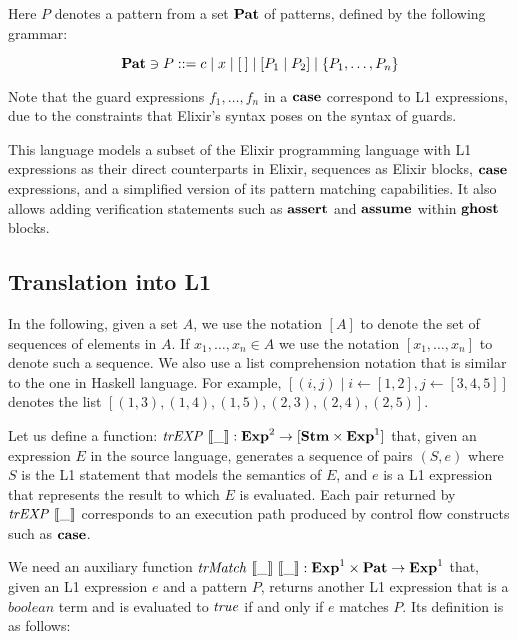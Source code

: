 Here $P$ denotes a pattern from a set $\mathbf{Pat}$ of patterns, defined by the 
following grammar:

\[
\mathbf{Pat} \ni P ::= c \mid x \mid [\:] \mid [P_1 \mid P_2] \mid \{ P_1, \ldots, P_n \}
\]

Note that the guard expressions $f_1, \ldots, f_n$ in a $\textbf{case}$ correspond to
L1 expressions, due to the constraints that Elixir's syntax poses on the syntax
of guards.

This language models a subset of the Elixir programming language with L1
expressions as their direct counterparts in Elixir, sequences as Elixir blocks,
$\textbf{case}$ expressions, and a simplified version of its pattern matching
capabilities.  It also allows adding verification statements such as $\textbf{assert}$
and $\textbf{assume}$ within $\textbf{ghost}$ blocks.

\subsection{Translation into L1}

In the following, given a set $A$, we use the notation $[A]$ to denote the set
of sequences of elements in $A$. If $x_1, \ldots, x_n \in A$ we use the notation
$[x_1, \ldots, x_n]$ to denote such a sequence. We also use a list comprehension
notation that is similar to the one in Haskell language. For example, $[(i, j)
\mid i \leftarrow [1, 2], j \leftarrow [3, 4, 5]]$ denotes the list $[(1, 3),
(1, 4), (1, 5), (2, 3), (2, 4), (2, 5)]$.

Let us define a function: $\mathit{trEXP}~\llbracket\_\rrbracket : \mathbf{Exp}^{2} \rightarrow [\mathbf{Stm} \times
\mathbf{Exp}^{1}]$ that, given an expression $E$ in the source language, generates a
sequence of pairs $(S, e)$ where $S$ is the L1 statement that models the
semantics of $E$, and $e$ is a L1 expression that represents the result to which
$E$ is evaluated. Each pair returned by $\mathit{trEXP}~\llbracket\_\rrbracket$ corresponds to an execution
path produced by control flow constructs such as $\textbf{case}$.

We need an auxiliary function $\mathit{trMatch}~\llbracket\_\rrbracket~\llbracket\_\rrbracket : \mathbf{Exp}^{1} \times \mathbf{Pat}
\rightarrow \mathbf{Exp}^{1}$ that, given an L1 expression $e$ and a pattern $P$, returns
another L1 expression that is a $\mathit{boolean}$ term and is evaluated to
$\mathit{true}$ if and only if $e$ matches $P$. Its definition is as follows:

